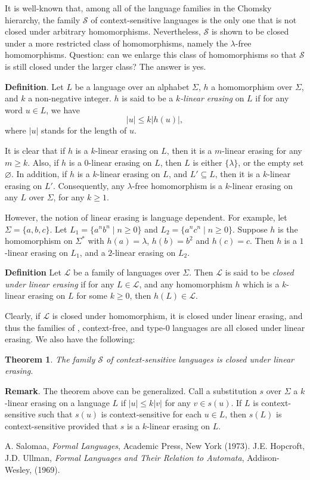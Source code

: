 \documentclass[12pt]{article}
\newtheorem{thm}{Theorem}
\begin{document}
It is well-known that, among all of the language families in the Chomsky hierarchy, the family $\mathscr{S}$ of context-sensitive languages is the only one that is not closed under arbitrary homomorphisms.  Nevertheless, $\mathscr{S}$ is shown to be closed under a more restricted class of homomorphisms, namely the $\lambda$-free homomorphisms.  Question: can we enlarge this class of homomorphisms so that $\mathscr{S}$ is still closed under the larger class?  The answer is yes.

\textbf{Definition}.  Let $L$ be a language over an alphabet $\Sigma$, $h$ a homomorphism over $\Sigma$, and $k$ a non-negative integer.  $h$ is said to be a \emph{$k$-linear erasing} on $L$ if for any word $u\in L$, we have $$|u|\le k |h(u)|,$$
where $|u|$ stands for the length of $u$.

It is clear that if $h$ is a $k$-linear erasing on $L$, then it is a $m$-linear erasing for any $m\ge k$.  Also, if $h$ is a $0$-linear erasing on $L$, then $L$ is either $\lbrace \lambda\rbrace$, or the empty set $\varnothing$.  In addition, if $h$ is a $k$-linear erasing on $L$, and $L'\subseteq L$, then it is a $k$-linear erasing on $L'$.  Consequently, any $\lambda$-free homomorphism is a $k$-linear erasing on any $L$ over $\Sigma$, for any $k\ge 1$.

However, the notion of linear erasing is language dependent.  For example, let $\Sigma = \lbrace a,b,c\rbrace$.  Let $L_1 = \lbrace a^nb^n \mid n\ge 0\rbrace$ and $L_2= \lbrace a^nc^n \mid n\ge 0\rbrace$.  Suppose $h$ is the homomorphism on $\Sigma^*$ with $h(a)=\lambda$, $h(b)=b^2$ and $h(c)=c$.  Then $h$ is a $1$-linear erasing on $L_1$, and a $2$-linear erasing on $L_2$.

\textbf{Definition}  Let $\mathscr{L}$ be a family of languages over $\Sigma$.  Then $\mathscr{L}$ is said to be \emph{closed under linear erasing} if for any $L\in \mathscr{L}$, and any homomorphism $h$ which is a $k$-linear erasing on $L$ for some $k\ge 0$, then $h(L)\in \mathscr{L}$.

Clearly, if $\mathscr{L}$ is closed under homomorphism, it is closed under linear erasing, and thus the families of , context-free, and type-0 languages are all closed under linear erasing.  We also have the following:
\begin{thm} The family $\mathscr{S}$ of context-sensitive languages is closed under linear erasing. \end{thm}

\textbf{Remark}.  The theorem above can be generalized.  Call a substitution $s$ over $\Sigma$ a $k$-linear erasing on a language $L$ if $|u|\le k|v|$ for any $v\in s(u)$.  If $L$ is context-sensitive such that $s(u)$ is context-sensitive for each $u\in L$, then $s(L)$ is context-sensitive provided that $s$ is a $k$-linear erasing on $L$.

\begin{thebibliography}{9}
 A. Salomaa, {\em Formal Languages}, Academic Press, New York (1973).
 J.E. Hopcroft, J.D. Ullman, {\em Formal Languages and Their Relation to Automata}, Addison-Wesley, (1969).
\end{thebibliography}
\end{document}
